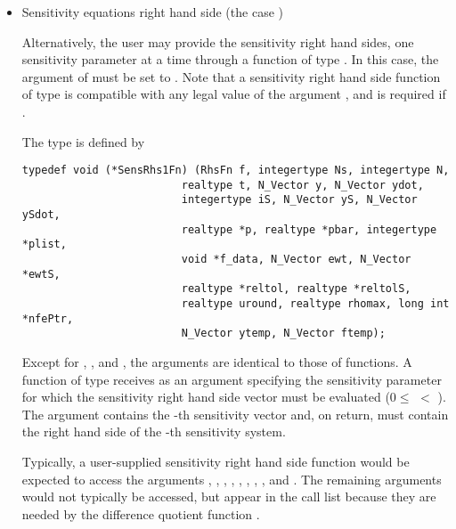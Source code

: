 \begin{itemize}
\item Sensitivity equations right hand side (the case )
  
  Alternatively, the user may provide the sensitivity right hand sides, one sensitivity
  parameter at a time through a function of type . 
  In this case, the argument  of  must be set to . 
  Note that a sensitivity right hand side function of type  is compatible with
  any legal value of the  argument , and is 
  required if .

  The type  is defined by
\begin{verbatim}
typedef void (*SensRhs1Fn) (RhsFn f, integertype Ns, integertype N, 
                         realtype t, N_Vector y, N_Vector ydot, 
                         integertype iS, N_Vector yS, N_Vector ySdot, 
                         realtype *p, realtype *pbar, integertype *plist, 
                         void *f_data, N_Vector ewt, N_Vector *ewtS, 
                         realtype *reltol, realtype *reltolS,
                         realtype uround, realtype rhomax, long int *nfePtr,
                         N_Vector ytemp, N_Vector ftemp);
\end{verbatim}
  Except for , , and , the arguments are identical to those of 
   functions.
  A function of type  receives as an argument  specifying the
  sensitivity parameter for which the sensitivity right hand side vector must be
  evaluated ($0 \le$  $<$ ). The argument  contains the -th
  sensitivity vector and, on return,  must contain the right hand side of the
  -th sensitivity system.

  Typically, a user-supplied sensitivity right hand side function would be expected 
  to access the arguments , , , , , , , 
  , and . The remaining arguments would not typically be accessed,
  but appear in the call list because they are needed by the difference quotient function 
  .  

%
\end{itemize}

